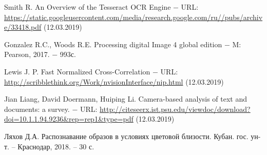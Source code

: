 \documentclass[oneside,final,14pt]{extreport}
\newcommand{\urlTitle}{ $-$ URL: }
\begin{document}
\newpage
\begin{thebibliography}{0}

Smith R. An Overview of the Tesseract OCR Engine \urlTitle
\url{https://static.googleusercontent.com/media/research.google.com/ru//pubs/archive/33418.pdf} (12.03.2019)

  Gonzalez R.C.,  Woods R.E. Processing digital Image 4 global edition $-$ M: Pearson, 2017. $-$ 993с. 

Lewis J. P. Fast Normalized Cross-Correlation 
\urlTitle \url{http://scribblethink.org/Work/nvisionInterface/nip.html} (12.03.2019)

﻿Jian Liang, David Doermann, Huiping Li. Camera-based analysis of text and documents: a survey. \urlTitle \url{http://citeseerx.ist.psu.edu/viewdoc/download?doi=10.1.1.94.9236&rep=rep1&type=pdf} (12.03.2019)


 Ляхов Д.А. Распознавание образов в условиях цветовой близости.  Кубан. гос. ун-т. – Краснодар, 2018. – 30 с.

\end{thebibliography}
\end{document}
